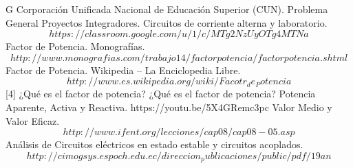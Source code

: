 \documentclass[letterpaper, 10 pt, conference]{ieeeconf}  %
\begin{document}
\begin{thebibliography}{99}

 G Corporación Unificada Nacional de Educación Superior (CUN). Problema General Proyectos Integradores. Circuitos de corriente alterna y laboratorio. $$ https://classroom.google.com/u/1/c/MTg2NzUyOTg4MTNa $$
 Factor de Potencia. Monografías. $$ http://www.monografias.com/trabajo14/factorpotencia/factorpotencia.shtml $$
 Factor de Potencia. Wikipedia – La Enciclopedia Libre. $$ http://www.es.wikipedia.org/wiki/Facotr_de_Potencia $$
[4]	¿Qué es el factor de potencia?
 ¿Qué es el factor de potencia? Potencia Aparente, Activa y Reactiva. https://youtu.be/5X4GRemc3pc
 Valor Medio y Valor Eficaz. $$ http://www.ifent.org/lecciones/cap08/cap08-05.asp $$
 Análisis de Circuitos eléctricos en estado estable y circuitos acoplados. $$ http://cimogsys.espoch.edu.ec/direccion_publicaciones/public/pdf/19an%
$$

\end{thebibliography}
\end{document}
